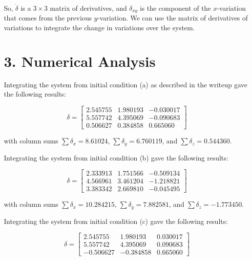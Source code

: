 \documentclass[12pt, letterpaper]{article}
\begin{document}
So, $\dot{\delta}$ is a $3 \times 3$ matrix of derivatives, and $\delta_{xy}$ is
the component of the $x$-variation that comes from the previous $y$-variation. 
We can use the matrix of derivatives of variations to integrate the change in 
variations over the system.

\section*{3. Numerical Analysis}

Integrating the system from initial condition (a) as described in the writeup
gave the following results:

\begin{equation}
\delta = \left[ \begin{array}{ccc}
2.545755 & 1.980193 & -0.030017 \\
5.557742 & 4.395069 & -0.090683 \\
0.506627 & 0.384858 & 0.665060
\end{array} \right]
\end{equation}

\vspace{0.6em}

with column sums $\sum{\delta_x} = 8.61024$, $\sum{\delta_y} = 6.760119$, and 
$\sum{\delta_z} = 0.544360$. 

\vspace{1em}

Integrating the system from initial condition (b) gave the following results:

\begin{equation}
\delta = \left[ \begin{array}{ccc}
2.333913 & 1.751566 & -0.509134 \\
4.566961 & 3.461204 & -1.218821 \\
3.383342 & 2.669810 & -0.045495 
\end{array} \right]
\end{equation}

\vspace{0.6em}

with column sums $\sum{\delta_x} = 10.284215$, $\sum{\delta_y} = 7.882581$, and
$\sum{\delta_z} = -1.773450$. 

\vspace{1em}

Integrating the system from initial condition (c) gave the following results:

\begin{equation}
\delta = \left[ \begin{array}{ccc}
2.545755  &  1.980193  & 0.030017 \\
5.557742  &  4.395069  & 0.090683 \\
-0.506627 &  -0.384858 & 0.665060 
\end{array} \right]
\end{equation}
\end{document}
